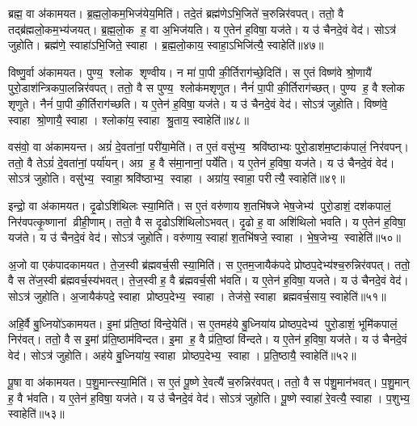 ब्रह्म॒ वा अ॑कामयत।
ब्र॒ह्म॒लो॒कम॒भिज॑येय॒मिति॑।
तदे॒तं ब्रह्म॑णेऽभि॒जिते॑ च॒रुन्निर॑वपत्।
ततो॒ वै तद्ब्र॑ह्मलो॒कम॒भ्य॑जयत्।
ब्र॒ह्म॒लो॒क ह॒ वा अ॒भिज॑यति।
य ए॒तेन॑ ह॒विषा॒ यज॑ते।
य उ॑ चैनदे॒वं वेद॑।
सोऽत्र॑ जुहोति।
ब्रह्म॑णे॒ स्वाहा॑ऽभि॒जिते॒ स्वाहा।
ब्र॒ह्म॒लो॒काय॒ स्वाहा॒ऽभिजि॑त्यै॒ स्वाहेति॑॥४७॥

विष्णु॒र्वा अ॑कामयत।
पुण्य॒ श्लोक शृण्वीय।
न मा॑ पा॒पी की॒र्तिराग॑च्छे॒दिति॑।
स ए॒तं विष्ण॑वे श्रो॒णायै॑ पुरो॒डाश॑न्त्रिकपा॒लन्निर॑वपत्।
ततो॒ वै स पुण्य॒ श्लोक॑मशृणुत।
नैनं॑ पा॒पी की॒र्तिराग॑च्छत्।
पुण्य ह॒ वै श्लोक शृणुते।
नैनं॑ पा॒पी की॒र्तिराग॑च्छति।
य ए॒तेन॑ ह॒विषा॒ यज॑ते।
य उ॑ चैनदे॒वं वेद॑।
सोऽत्र॑ जुहोति।
विष्ण॑वे॒ स्वाहा श्रो॒णायै॒ स्वाहा।
श्लोका॑य॒ स्वाहा श्रु॒ताय॒ स्वाहेति॑॥४८॥

वस॑वो॒ वा अ॑कामयन्त।
अग्रं॑ दे॒वता॑नां॒ परी॑या॒मेति॑।
त ए॒तं वसु॑भ्य॒ श्रवि॑ष्ठाभ्यः पुरो॒डाश॑म॒ष्टाक॑पालं॒ निर॑वपन्।
ततो॒ वै तेऽग्रं॑ दे॒वता॑नां॒ पर्या॑यन्।
अग्र ह॒ वै स॑मा॒नानां॒ पर्ये॑ति।
य ए॒तेन॑ ह॒विषा॒ यज॑ते।
य उ॑ चैनदे॒वं वेद॑।
सोऽत्र॑ जुहोति।
वसु॑भ्य॒ स्वाहा॒ श्रवि॑ष्ठाभ्य॒ स्वाहा।
अग्रा॑य॒ स्वाहा॒ परीत्यै॒ स्वाहेति॑॥४९॥

इन्द्रो॒ वा अ॑कामयत।
दृ॒ढोऽशि॑थिलः स्या॒मिति॑।
स ए॒तं वरु॑णाय श॒तभि॑षजे भेष॒जेभ्य॑ पुरो॒डाशं॒ दश॑कपालं॒ निर॑वपत्कृ॒ष्णानां व्रीही॒णाम्।
ततो॒ वै स दृ॒ढोऽशि॑थिलोऽभवत्।
दृ॒ढो ह॒ वा अशि॑थिलो भवति।
य ए॒तेन॑ ह॒विषा॒ यज॑ते।
य उ॑ चैनदे॒वं वेद॑।
सोऽत्र॑ जुहोति।
वरु॑णाय॒ स्वाहा॑ श॒तभि॑षजे॒ स्वाहा।
भे॒ष॒जेभ्य॒ स्वाहेति॑॥५०॥

अ॒जो वा एक॑पादकामयत।
ते॒ज॒स्वी ब्र॑ह्मवर्च॒सी स्या॒मिति॑।
स ए॒तम॒जायैक॑पदे प्रोष्ठप॒देभ्य॑श्च॒रुन्निर॑वपत्।
ततो॒ वै स ते॑ज॒स्वी ब्र॑ह्मवर्च॒स्य॑भवत्।
ते॒ज॒स्वी ह॒ वै ब्र॑ह्मवर्च॒सी भ॑वति।
य ए॒तेन॑ ह॒विषा॒ यजते।
य उ॑ चैनदे॒वं वेद॑।
सोऽत्र॑ जुहोति।
अ॒जायैक॑पदे॒ स्वाहा प्रोष्ठप॒देभ्य॒ स्वाहा।
तेज॑से॒ स्वाहा ब्रह्मवर्च॒साय॒ स्वाहेति॑॥५१॥

अहि॒र्वै बु॒ध्नियो॑ऽकामयत।
इ॒मां प्र॑ति॒ष्ठां वि॑न्दे॒येति॑।
स ए॒तमह॑ये बु॒ध्निया॑य प्रोष्ठप॒देभ्य॑ पुरो॒डाशं॒ भूमि॑कपालं॒ निर॑वत्।
ततो॒ वै स इ॒मां प्र॑ति॒ष्ठाम॑विन्दत।
इ॒मा ह॒ वै प्र॑ति॒ष्ठां वि॑न्दते।
य ए॒तेन॑ ह॒विषा॒ यज॑ते।
य उ॑ चैनदे॒वं वेद॑।
सोऽत्र॑ जुहोति।
अह॑ये बु॒ध्निया॑य॒ स्वाहा प्रोष्ठप॒देभ्य॒ स्वाहा।
प्र॒ति॒ष्ठायै॒ स्वाहेति॑॥५२॥

पू॒षा वा अ॑कामयत।
प॒शु॒मान्त्स्या॒मिति॑।
स ए॒तं पू॒ष्णे रे॒वत्यै॑ च॒रुन्निर॑वपत्।
ततो॒ वै स प॑शु॒मान॑भवत्।
प॒शु॒मान् ह॒ वै भ॑वति।
य ए॒तेन॑ ह॒विषा॒ यज॑ते।
य उ॑ चैनदे॒वं वेद॑।
सोऽत्र॑ जुहोति।
पू॒ष्णे स्वाहा॑ रे॒वत्यै॒ स्वाहा।
प॒शुभ्य॒ स्वाहेति॑॥५३॥

